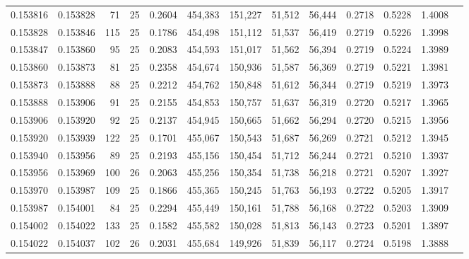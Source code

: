 \begin{tabular}{rrrrrrrrrrrrr}
0.153816 & 0.153828 &    71 &  25 &                                     0.2604 & 454,383 & 151,227 &  51,512 &  56,444 & 0.2718 & 0.5228 & 1.4008 \\
0.153828 & 0.153846 &   115 &  25 &                                     0.1786 & 454,498 & 151,112 &  51,537 &  56,419 & 0.2719 & 0.5226 & 1.3998 \\
0.153847 & 0.153860 &    95 &  25 &                                     0.2083 & 454,593 & 151,017 &  51,562 &  56,394 & 0.2719 & 0.5224 & 1.3989 \\
0.153860 & 0.153873 &    81 &  25 &                                     0.2358 & 454,674 & 150,936 &  51,587 &  56,369 & 0.2719 & 0.5221 & 1.3981 \\
0.153873 & 0.153888 &    88 &  25 &                                     0.2212 & 454,762 & 150,848 &  51,612 &  56,344 & 0.2719 & 0.5219 & 1.3973 \\
0.153888 & 0.153906 &    91 &  25 &                                     0.2155 & 454,853 & 150,757 &  51,637 &  56,319 & 0.2720 & 0.5217 & 1.3965 \\
0.153906 & 0.153920 &    92 &  25 &                                     0.2137 & 454,945 & 150,665 &  51,662 &  56,294 & 0.2720 & 0.5215 & 1.3956 \\
0.153920 & 0.153939 &   122 &  25 &                                     0.1701 & 455,067 & 150,543 &  51,687 &  56,269 & 0.2721 & 0.5212 & 1.3945 \\
0.153940 & 0.153956 &    89 &  25 &                                     0.2193 & 455,156 & 150,454 &  51,712 &  56,244 & 0.2721 & 0.5210 & 1.3937 \\
0.153956 & 0.153969 &   100 &  26 &                                     0.2063 & 455,256 & 150,354 &  51,738 &  56,218 & 0.2721 & 0.5207 & 1.3927 \\
0.153970 & 0.153987 &   109 &  25 &                                     0.1866 & 455,365 & 150,245 &  51,763 &  56,193 & 0.2722 & 0.5205 & 1.3917 \\
0.153987 & 0.154001 &    84 &  25 &                                     0.2294 & 455,449 & 150,161 &  51,788 &  56,168 & 0.2722 & 0.5203 & 1.3909 \\
0.154002 & 0.154022 &   133 &  25 &                                     0.1582 & 455,582 & 150,028 &  51,813 &  56,143 & 0.2723 & 0.5201 & 1.3897 \\
0.154022 & 0.154037 &   102 &  26 &                                     0.2031 & 455,684 & 149,926 &  51,839 &  56,117 & 0.2724 & 0.5198 & 1.3888 \\

\end{tabular}
